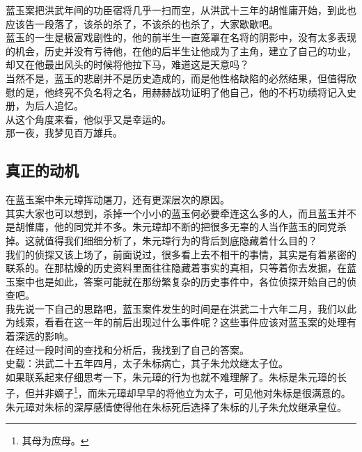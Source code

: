 \begin{multicols}{\theparacolNo}
蓝玉案把洪武年间的功臣宿将几乎一扫而空，从洪武十三年的胡惟庸开始，到此也应该告一段落了，该杀的杀了，不该杀的也杀了，大家歇歇吧。\\

蓝玉的一生是极富戏剧性的，他的前半生一直笼罩在名将的阴影中，没有太多表现的机会，历史并没有亏待他，在他的后半生让他成为了主角，建立了自己的功业，却又在他最出风头的时候将他拉下马，难道这是天意吗？\\

当然不是，蓝玉的悲剧并不是历史造成的，而是他性格缺陷的必然结果，但值得欣慰的是，他终究不负名将之名，用赫赫战功证明了他自己，他的不朽功绩将记入史册，为后人追忆。\\

从这个角度来看，他似乎又是幸运的。\\

那一夜，我梦见百万雄兵。\\

\subsection{真正的动机}
在蓝玉案中朱元璋挥动屠刀，还有更深层次的原因。\\

其实大家也可以想到，杀掉一个小小的蓝玉何必要牵连这么多的人，而且蓝玉并不是胡惟庸，他的同党并不多。朱元璋却不断的把很多无辜的人当作蓝玉的同党杀掉。这就值得我们细细分析了，朱元璋行为的背后到底隐藏着什么目的？\\

我们的侦探又该上场了，前面说过，很多看上去不相干的事情，其实是有着紧密的联系的。在那枯燥的历史资料里面往往隐藏着事实的真相，只等着你去发掘，在蓝玉案中也是如此，答案可能就在那纷繁复杂的历史事件中，各位侦探开始自己的侦查吧。\\

我先说一下自己的思路吧，蓝玉案件发生的时间是在洪武二十六年二月，我们以此为线索，看看在这一年的前后出现过什么事件呢？这些事件应该对蓝玉案的处理有着深远的影响。\\

在经过一段时间的查找和分析后，我找到了自己的答案。\\

史载：洪武二十五年四月，太子朱标病亡，其子朱允炆继太子位。\\

如果联系起来仔细思考一下，朱元璋的行为也就不难理解了。朱标是朱元璋的长子，但并非嫡子\footnote{其母为庶母。}，而朱元璋却早早的将他立为太子，可见他对朱标是很满意的。朱元璋对朱标的深厚感情使得他在朱标死后选择了朱标的儿子朱允炆继承皇位。\\


\end{multicols}
